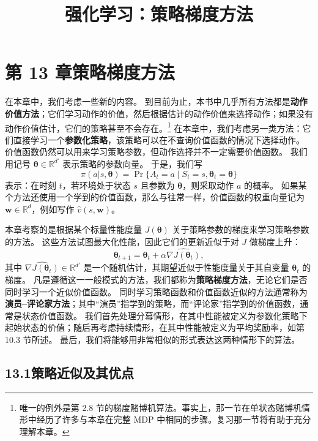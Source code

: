 \documentclass[UTF8,12pt,a4paper,fontset=fandol]{ctexart}
\title{强化学习：策略梯度方法}
\author{}
\date{}
\begin{document}
\maketitle

\section*{第 13 章\quad 策略梯度方法}

在本章中，我们考虑一些新的内容。
到目前为止，本书中几乎所有方法都是\textbf{动作价值方法}；它们学习动作的价值，然后根据估计的动作价值来选择动作；如果没有动作价值估计，它们的策略甚至不会存在。\footnote{唯一的例外是第 2.8 节的梯度赌博机算法。事实上，那一节在单状态赌博机情形中经历了许多与本章在完整 MDP 中相同的步骤。复习那一节将有助于充分理解本章。}
在本章中，我们考虑另一类方法：它们直接学习一个\textbf{参数化策略}，该策略可以在不查询价值函数的情况下选择动作。
价值函数仍然可以用来学习策略参数，但动作选择并不一定需要价值函数。
我们用记号 $\boldsymbol{\theta}\in\mathbb{R}^{d'}$ 表示策略的参数向量。
于是，我们写
\[
\pi(a|s,\boldsymbol{\theta})=\Pr\{A_t=a\mid S_t=s,\boldsymbol{\theta}_t=\boldsymbol{\theta}\}
\]
表示：在时刻 $t$，若环境处于状态 $s$ 且参数为 $\boldsymbol{\theta}$，则采取动作 $a$ 的概率。
如果某个方法还使用一个学到的价值函数，那么与往常一样，价值函数的权重向量记为 $\mathbf{w}\in\mathbb{R}^d$，例如写作 $\hat v(s,\mathbf{w})$。

本章考察的是根据某个标量性能度量 $J(\boldsymbol{\theta})$ 关于策略参数的梯度来学习策略参数的方法。
这些方法试图最大化性能，因此它们的更新近似于对 $J$ 做梯度上升：
\begin{equation}
\boldsymbol{\theta}_{t+1}=\boldsymbol{\theta}_t+\alpha \widehat{\nabla J(\boldsymbol{\theta}_t)},
\tag{13.1}
\end{equation}
其中 $\widehat{\nabla J(\boldsymbol{\theta}_t)}\in\mathbb{R}^{d'}$ 是一个随机估计，其期望近似于性能度量关于其自变量 $\boldsymbol{\theta}_t$ 的梯度。
凡是遵循这一一般模式的方法，我们都称为\textbf{策略梯度方法}，无论它们是否同时学习一个近似价值函数。
同时学习策略函数和价值函数近似的方法通常称为\textbf{演员--评论家方法}；其中“演员”指学到的策略，而“评论家”指学到的价值函数，通常是状态价值函数。
我们首先处理分幕情形，在其中性能被定义为参数化策略下起始状态的价值；随后再考虑持续情形，在其中性能被定义为平均奖励率，如第 10.3 节所述。
最后，我们将能够用非常相似的形式表达这两种情形下的算法。

\subsection*{13.1\quad 策略近似及其优点}
\end{document}
